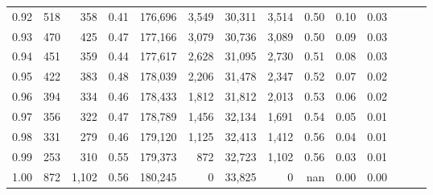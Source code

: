 \begin{tabular}{rrrrrrrrrrrrrr}
0.92 &    518 &    358 &  0.41 &  176,696 &    3,549 &  30,311 &   3,514 &  0.50 &  0.10 &      0.03 \\
0.93 &    470 &    425 &  0.47 &  177,166 &    3,079 &  30,736 &   3,089 &  0.50 &  0.09 &      0.03 \\
0.94 &    451 &    359 &  0.44 &  177,617 &    2,628 &  31,095 &   2,730 &  0.51 &  0.08 &      0.03 \\
0.95 &    422 &    383 &  0.48 &  178,039 &    2,206 &  31,478 &   2,347 &  0.52 &  0.07 &      0.02 \\
0.96 &    394 &    334 &  0.46 &  178,433 &    1,812 &  31,812 &   2,013 &  0.53 &  0.06 &      0.02 \\
0.97 &    356 &    322 &  0.47 &  178,789 &    1,456 &  32,134 &   1,691 &  0.54 &  0.05 &      0.01 \\
0.98 &    331 &    279 &  0.46 &  179,120 &    1,125 &  32,413 &   1,412 &  0.56 &  0.04 &      0.01 \\
0.99 &    253 &    310 &  0.55 &  179,373 &      872 &  32,723 &   1,102 &  0.56 &  0.03 &      0.01 \\
1.00 &    872 &  1,102 &  0.56 &  180,245 &        0 &  33,825 &       0 &   nan &  0.00 &      0.00 \\
\bottomrule
\end{tabular}
